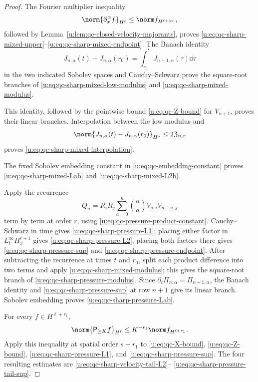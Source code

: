 {\begin{proof}
The Fourier multiplier inequality
\[
 \norm{\partial_x^\alpha f}_{H^\ell}
 \le\norm f_{H^{\ell+|\alpha|}},
\]
followed by Lemma~\ref{u:lem:qc-closed-velocity-majorants}, proves
\eqref{u:eq:qc-sharp-mixed-upper}--\eqref{u:eq:qc-sharp-mixed-endpoint}.
The Banach identity
\[
 J_{n,\alpha}(t)-J_{n,\alpha}(r_0)
 =\int_{r_0}^tJ_{n+1,\alpha}(\tau)\dd\tau
\]
in the two indicated Sobolev spaces and Cauchy--Schwarz prove the
square-root branches of \eqref{u:eq:qc-sharp-mixed-low-modulus} and
\eqref{u:eq:qc-sharp-mixed-modulus}.
\begin{samepage}
This identity, followed by the
pointwise bound \eqref{u:eq:qc-Z-bound} for \(V_{n+1}\), proves their linear
branches.  Interpolation between the low modulus
and
\[
 \norm{J_{n,\alpha}(t)-J_{n,\alpha}(r_0)}_{H^s}
 \le2\mathfrak Z_{n,r}
\]
proves \eqref{u:eq:qc-sharp-mixed-interpolation}.
\end{samepage}
The fixed Sobolev embedding constant in \eqref{u:eq:qc-embedding-constant} proves
\eqref{u:eq:qc-sharp-mixed-Lab} and \eqref{u:eq:qc-sharp-mixed-L2b}.

Apply the recurrence
\[
 Q_n=R_iR_j\sum_{a=0}^{n}\binom naV_{a,i}V_{n-a,j}
\]
term by term at order \(r\), using
\eqref{u:eq:qc-pressure-product-constant}.  Cauchy--Schwarz in time gives
\eqref{u:eq:qc-sharp-pressure-L1}; placing either factor in
\(L_t^\infty H_x^{r+1}\) gives
\eqref{u:eq:qc-sharp-pressure-L2}; placing both factors there gives
\eqref{u:eq:qc-sharp-pressure-sup} and
\eqref{u:eq:qc-sharp-pressure-endpoint}.  After subtracting the recurrence at
times \(t\) and \(r_0\), split each product difference into two terms and
apply \eqref{u:eq:qc-sharp-mixed-modulus}; this gives the square-root branch
of \eqref{u:eq:qc-sharp-pressure-modulus}.  Since
\(\partial_t\Pi_{n,\alpha}=\Pi_{n+1,\alpha}\), the Banach identity and
\eqref{u:eq:qc-sharp-pressure-sup} at row \(n+1\) give its linear branch.
Sobolev embedding proves
\eqref{u:eq:qc-sharp-pressure-Lab}.

For every \(f\in H^{\ell+r_1}\),
\[
 \norm{\mathsf P_{\ge K}f}_{H^\ell}
 \le K^{-r_1}\norm f_{H^{\ell+r_1}}.
\]
Apply this inequality at spatial order \(s+r_1\) to
\eqref{u:eq:qc-X-bound}, \eqref{u:eq:qc-Z-bound},
\eqref{u:eq:qc-sharp-pressure-L1}, and
\eqref{u:eq:qc-sharp-pressure-sup}.  The four resulting estimates are
\eqref{u:eq:qc-sharp-velocity-tail-L2}--%
\eqref{u:eq:qc-sharp-pressure-tail-sup}.


\end{proof}}
